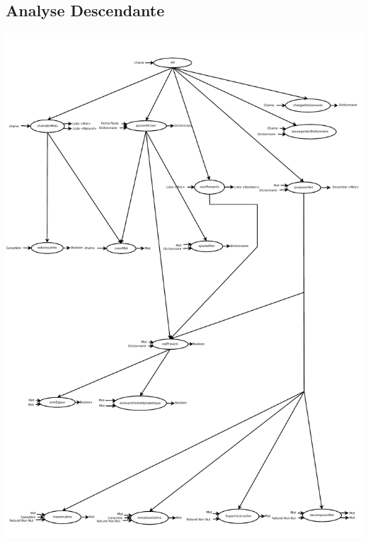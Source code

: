 		\subsection{Analyse Descendante}
			\begin{center}
			\includegraphics[scale=0.6]{images/AnalyseDescendante.pdf}
			\end{center}
